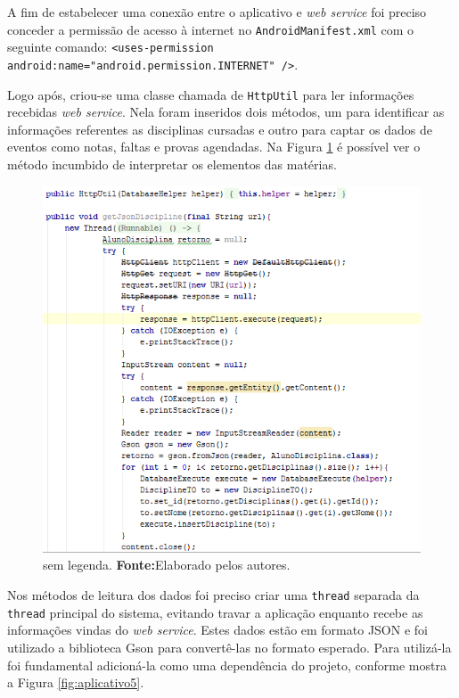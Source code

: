 	\pagebreak
	
	\par A fim de estabelecer uma conexão entre o aplicativo e \textit{web service}
foi preciso conceder a permissão de acesso à internet no
\texttt{AndroidManifest.xml} com o seguinte comando: \texttt{<uses-permission
android:name="android.permission.INTERNET" />}.

	\par Logo após, criou-se uma classe chamada de \texttt{HttpUtil} para ler
informações recebidas \textit{web service}. Nela foram inseridos dois métodos,
um para identificar as informações referentes as disciplinas cursadas e outro
para captar os dados de eventos como notas, faltas e provas agendadas. Na
Figura \ref{fig:aplicativo4} é possível ver o método incumbido de interpretar
os elementos das matérias.

	\begin{figure}[h!] 
		\centerline{\includegraphics[scale=0.7]{./imagens/2_q_metodologico/4_procedimentos_resultados/42_aplicativo/aplicativo4.png}}
		\caption[sem legenda]{sem legenda. \textbf{Fonte:}Elaborado pelos autores.}
		\label{fig:aplicativo4}
	\end{figure}
	
	\pagebreak
	
	\par Nos métodos de leitura dos dados foi preciso criar uma \texttt{thread}
separada da \texttt{thread} principal do sistema, evitando travar a aplicação
enquanto recebe as informações vindas do \textit{web service}. Estes dados
estão em formato JSON e foi utilizado a biblioteca Gson para convertê-las no
formato esperado. Para utilizá-la foi fundamental adicioná-la como uma
dependência do projeto, conforme mostra a Figura \ref{fig:aplicativo5}.
	
